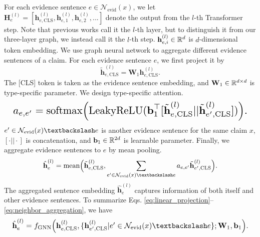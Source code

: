 For each evidence sentence $ e\in\mathcal{N}_{\text{evid}}(x) $, we let $ \textbf{H}_e^{(l)}=[\textbf{h}_{e,\text{CLS}}^{(l)},\textbf{h}_{e,1}^{(l)},\textbf{h}_{e,2}^{(l)},...] $ denote the output from the $ l $-th Transformer step. Note that previous works call it the $ l $-th layer, but to distinguish it from our three-layer graph, we instead call it the $ l $-th step. $ \textbf{h}_{e,i}^{(l)}\in\Bbb R^d $ is $ d $-dimensional token embedding. We use graph neural network to aggregate different evidence sentences of a claim. For each evidence sentence $ e $, we first project it by
\begin{equation}
\label{eq:linear_projection}
    \tilde{\textbf{h}}_{e,\text{CLS}}^{(l)}=\textbf{W}_1\textbf{h}_{e,\text{CLS}}^{(l)}.
\end{equation}
The [CLS] token is taken as the evidence sentence embedding, and $ \textbf{W}_1\in\Bbb R^{d\times d} $ is type-specific parameter. We design type-specific attention.
\begin{equation}
\label{eq:neighbor_attention}
\resizebox{\columnwidth}{!}{
	$ a_{e,e^\prime}=\text{softmax}\Bigl(\text{LeakyReLU}(\textbf{b}_1^{\top}[\tilde{\textbf{h}}_{e,\text{CLS}}^{(l)}||\tilde{\textbf{h}}_{e^\prime,\text{CLS}}^{(l)}])\Bigl). $
 }
\end{equation}
$ e^\prime\in\mathcal{N}_{\text{evid}}(x)\textbackslash e $ is another evidence sentence for the same claim $ x $, $ [\cdot||\cdot] $ is concatenation, and $ \textbf{b}_1\in\Bbb R^{2d} $ is learnable parameter. Finally, we aggregate evidence sentences to $ e $ by mean pooling.
\begin{equation}
\label{eq:neighbor_aggregation}
    \hat{\textbf{h}}_e^{(l)}=\text{mean}\Bigl(\tilde{\textbf{h}}_{e,\text{CLS}}^{(l)},\sum_{e^\prime \in \mathcal{N}_{\text{evid}}(x)\textbackslash e}a_{e,e^\prime}\tilde{\textbf{h}}_{e^\prime,\text{CLS}}^{(l)}\Bigl).
\end{equation}
The aggregated sentence embedding $ \hat{\textbf{h}}_e^{(l)} $ captures information of both itself and other evidence sentences. To summarize Eqs. \ref{eq:linear_projection}--\ref{eq:neighbor_aggregation}, we have
\begin{equation}
\label{eq:graph_conv_layer}
\resizebox{\columnwidth}{!}{
    $ \hat{\textbf{h}}_e^{(l)}=f_{\text{GNN}}\Big(\textbf{h}_{e,\text{CLS}}^{(l)},\{\textbf{h}_{e^\prime,\text{CLS}}^{(l)}|e^\prime\in\mathcal{N}_{\text{evid}}(x)\textbackslash e\};\textbf{W}_1,\textbf{b}_1\Big). $
}
\end{equation}


